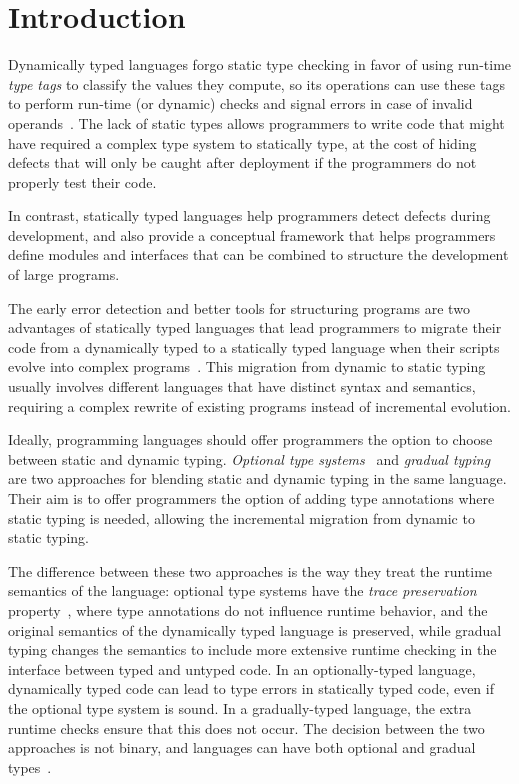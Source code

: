 \documentclass[10pt]{sigplanconf}
\begin{document}
\section{Introduction}
\label{sec:intro}

Dynamically typed languages forgo static type checking
in favor of using run-time {\em type tags} to classify
the values they compute, so its operations can use these
tags to perform run-time (or dynamic) checks and signal
errors in case of invalid operands~\cite{pierce2002tpl}.
The lack of static types allows programmers to write code
that might have required a complex type system to statically
type, at the cost of hiding defects that will only be caught
after deployment if the programmers do not properly
test their code.

In contrast, statically typed languages help programmers
detect defects during development, and also provide
a conceptual framework that helps programmers define modules
and interfaces that can be combined to structure the development
of large programs.

The early error detection and better tools for structuring
programs are two advantages of statically typed languages that
lead programmers to migrate their code from a dynamically
typed to a statically typed language when their scripts
evolve into complex programs~\cite{tobin-hochstadt2006ims}.
This migration from dynamic to static typing usually involves
different languages that have distinct syntax and semantics,
requiring a complex rewrite of existing programs instead of
incremental evolution.

Ideally, programming languages should offer programmers the
option to choose between static and dynamic typing.
\emph{Optional type systems}~\cite{bracha2004pluggable} and
\emph{gradual typing}~\cite{siek2006gradual} are two 
approaches for blending static and dynamic typing in the same
language. Their aim is to offer programmers the option
of adding type annotations where static typing is needed,
allowing the incremental migration from dynamic to static
typing. 

The difference between these two approaches is the
way they treat the runtime semantics of the language:
optional type systems have the {\em trace preservation}
property~\cite{strongscript}, where type annotations
do not influence runtime behavior, and the original
semantics of the dynamically typed language is preserved,
 while gradual typing changes the semantics to
include more extensive runtime checking in the
interface between typed and untyped code. 
In an optionally-typed language, dynamically typed code
can lead to type errors in statically typed code, even
if the optional type system is sound. In a gradually-typed
language, the extra runtime checks ensure that 
this does not occur.
 The decision
between the two approaches is not binary, and languages
can have both optional and gradual types~\cite{liketypes,strongscript}.
\end{document}
